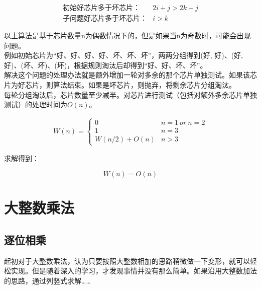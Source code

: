 \vspace{-1cm}

\begin{align*}
    \text{初始好芯片多于坏芯片：}   & 2i + j > 2k + j \\
    \text{子问题好芯片多于坏芯片：} & i > k
\end{align*}

以上算法是基于芯片数量n为偶数情况下的，但是如果当n为奇数时，可能会出现问题。 \\

例如初始芯片为“好、好、好、好、坏、坏、坏”，两两分组得到(好, 好)、(好, 好)、(坏、坏)、(坏)，根据规则淘汰后却得到“好、好、坏、坏”。 \\

解决这个问题的处理办法就是额外增加一轮对多余的那个芯片单独测试。如果该芯片为好芯片，则算法结束。如果是坏芯片，则抛弃，将剩余芯片分组淘汰。 \\

每轮分组淘汰后，芯片数量至少减半。对芯片进行测试（包括对额外多余芯片单独测试）的处理时间为$ O(n) $。

\vspace{-0.5cm}

\begin{align*}
    W(n) = \begin{cases}
        0             & n = 1\ or\ n = 2 \\
        1             & n = 3            \\
        W(n/2) + O(n) & n > 3
    \end{cases}
\end{align*}

求解得到：

\vspace{-0.5cm}

$$
    W(n) = O(n)
$$

\newpage

\section{大整数乘法}

\subsection{逐位相乘}

起初对于大整数乘法，认为只要按照大整数相加的思路稍微做一下变形，就可以轻松实现。但是随着深入的学习，才发现事情并没有那么简单。如果沿用大整数加法的思路，通过列竖式求解……

